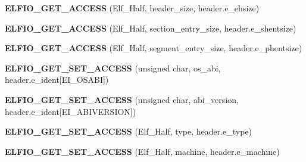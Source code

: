 \begin{DoxyCompactItemize}
\item 
{\bfseries E\+L\+F\+I\+O\+\_\+\+G\+E\+T\+\_\+\+A\+C\+C\+E\+SS} (Elf\+\_\+\+Half, header\+\_\+size, header.\+e\+\_\+ehsize)\hypertarget{class_e_l_f_i_o_1_1elf__header__impl_a6cf004e0d0c14a242cc17fc55cdac7a0}{}\label{class_e_l_f_i_o_1_1elf__header__impl_a6cf004e0d0c14a242cc17fc55cdac7a0}

\item 
{\bfseries E\+L\+F\+I\+O\+\_\+\+G\+E\+T\+\_\+\+A\+C\+C\+E\+SS} (Elf\+\_\+\+Half, section\+\_\+entry\+\_\+size, header.\+e\+\_\+shentsize)\hypertarget{class_e_l_f_i_o_1_1elf__header__impl_a10dec874c12e705e9897c6b231f6808a}{}\label{class_e_l_f_i_o_1_1elf__header__impl_a10dec874c12e705e9897c6b231f6808a}

\item 
{\bfseries E\+L\+F\+I\+O\+\_\+\+G\+E\+T\+\_\+\+A\+C\+C\+E\+SS} (Elf\+\_\+\+Half, segment\+\_\+entry\+\_\+size, header.\+e\+\_\+phentsize)\hypertarget{class_e_l_f_i_o_1_1elf__header__impl_a25c45d46c5ead97a253675cd94c27144}{}\label{class_e_l_f_i_o_1_1elf__header__impl_a25c45d46c5ead97a253675cd94c27144}

\item 
{\bfseries E\+L\+F\+I\+O\+\_\+\+G\+E\+T\+\_\+\+S\+E\+T\+\_\+\+A\+C\+C\+E\+SS} (unsigned char, os\+\_\+abi, header.\+e\+\_\+ident\mbox{[}E\+I\+\_\+\+O\+S\+A\+BI\mbox{]})\hypertarget{class_e_l_f_i_o_1_1elf__header__impl_aebdf9365324c5da906e322640902e6f0}{}\label{class_e_l_f_i_o_1_1elf__header__impl_aebdf9365324c5da906e322640902e6f0}

\item 
{\bfseries E\+L\+F\+I\+O\+\_\+\+G\+E\+T\+\_\+\+S\+E\+T\+\_\+\+A\+C\+C\+E\+SS} (unsigned char, abi\+\_\+version, header.\+e\+\_\+ident\mbox{[}E\+I\+\_\+\+A\+B\+I\+V\+E\+R\+S\+I\+ON\mbox{]})\hypertarget{class_e_l_f_i_o_1_1elf__header__impl_ac7df14428cbf48762e07fba690f9abe9}{}\label{class_e_l_f_i_o_1_1elf__header__impl_ac7df14428cbf48762e07fba690f9abe9}

\item 
{\bfseries E\+L\+F\+I\+O\+\_\+\+G\+E\+T\+\_\+\+S\+E\+T\+\_\+\+A\+C\+C\+E\+SS} (Elf\+\_\+\+Half, type, header.\+e\+\_\+type)\hypertarget{class_e_l_f_i_o_1_1elf__header__impl_a052ff49b5435203764c9ead3a7bc9594}{}\label{class_e_l_f_i_o_1_1elf__header__impl_a052ff49b5435203764c9ead3a7bc9594}

\item 
{\bfseries E\+L\+F\+I\+O\+\_\+\+G\+E\+T\+\_\+\+S\+E\+T\+\_\+\+A\+C\+C\+E\+SS} (Elf\+\_\+\+Half, machine, header.\+e\+\_\+machine)\hypertarget{class_e_l_f_i_o_1_1elf__header__impl_a6c9d93feb68b4b6c174721e1f2119a65}{}\label{class_e_l_f_i_o_1_1elf__header__impl_a6c9d93feb68b4b6c174721e1f2119a65}


\end{DoxyCompactItemize}
